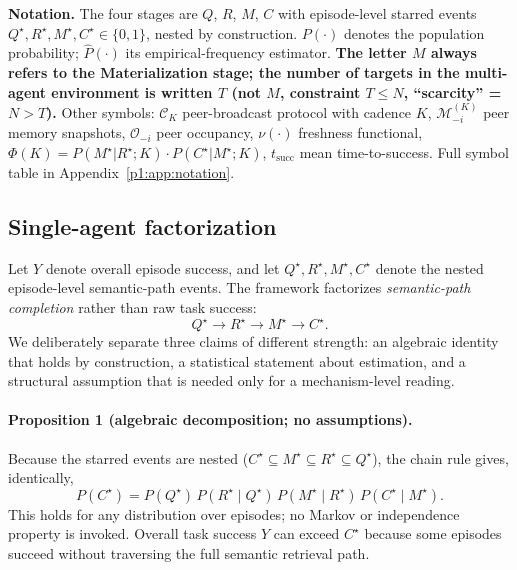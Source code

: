\documentclass{article}
\begin{document}
\textbf{Notation.} The four stages are $Q$, $R$, $M$, $C$ with episode-level starred events $Q^\star,R^\star,M^\star,C^\star\!\in\!\{0,1\}$, nested by construction. $P(\cdot)$ denotes the population probability; $\hat{P}(\cdot)$ its empirical-frequency estimator. \textbf{The letter $M$ always refers to the Materialization stage; the number of targets in the multi-agent environment is written $T$ (not $M$, constraint $T{\le}N$, ``scarcity'' = $N{>}T$).} Other symbols: $\mathcal{C}_K$ peer-broadcast protocol with cadence $K$, $\mathcal{M}_{-i}^{(K)}$ peer memory snapshots, $\mathcal{O}_{-i}$ peer occupancy, $\nu(\cdot)$ freshness functional, $\Phi(K){=}P(M^\star|R^\star;K)\!\cdot\!P(C^\star|M^\star;K)$, $t_{\mathrm{succ}}$ mean time-to-success. Full symbol table in Appendix~\ref{p1:app:notation}.

\subsection{Single-agent factorization}
\label{p1:sec:single-theory}

Let $Y$ denote overall episode success, and let
$Q^\star, R^\star, M^\star, C^\star$ denote the nested episode-level
semantic-path events. The framework factorizes \emph{semantic-path
completion} rather than raw task success:
\[
Q^\star \rightarrow R^\star \rightarrow M^\star \rightarrow C^\star.
\]
We deliberately separate three claims of different strength: an
algebraic identity that holds by construction, a statistical statement
about estimation, and a structural assumption that is needed only for
a mechanism-level reading.

\paragraph{Proposition 1 (algebraic decomposition; no assumptions).}
Because the starred events are nested
($C^\star \subseteq M^\star \subseteq R^\star \subseteq Q^\star$), the
chain rule gives, identically,
\[
P(C^\star)
=
P(Q^\star)\,
P(R^\star \mid Q^\star)\,
P(M^\star \mid R^\star)\,
P(C^\star \mid M^\star).
\]
This holds for any distribution over episodes; no Markov or
independence property is invoked. Overall task success $Y$ can exceed
$C^\star$ because some episodes succeed without traversing the full
semantic retrieval path.
\end{document}
